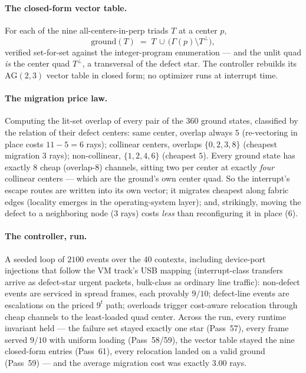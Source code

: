\documentclass[11pt]{article}
\begin{document}
\paragraph{The closed-form vector table.}  For each of the nine
all-centers-in-perp triads \(T\) at a center \(p\),
\[
  \mathrm{ground}(T) \;=\; T \,\cup\, \bigl(\Gamma(p)\setminus T^{\perp}\bigr),
\]
verified set-for-set against the integer-program enumeration --- and the unlit
quad \emph{is} the center quad \(T^\perp\), a transversal of the defect star.
The controller rebuilds its \(\mathrm{AG}(2,3)\) vector table in closed form;
no optimizer runs at interrupt time.

\paragraph{The migration price law.}  Computing the lit-set overlap of every
pair of the \(360\) ground states, classified by the relation of their defect
centers: same center, overlap always \(5\) (re-vectoring in place costs
\(11-5=6\) rays); collinear centers, overlaps \(\{0,2,3,8\}\) (cheapest
migration \(3\) rays); non-collinear, \(\{1,2,4,6\}\) (cheapest \(5\)).  Every
ground state has exactly \(8\) cheap (overlap-\(8\)) channels, sitting two per
center at exactly \emph{four} collinear centers --- which are the ground's own
center quad.  So the interrupt's escape routes are written into its own
vector; it migrates cheapest along fabric edges (locality emerges in the
operating-system layer); and, strikingly, moving the defect to a neighboring
node (\(3\) rays) costs \emph{less} than reconfiguring it in place (\(6\)).

\paragraph{The controller, run.}  A seeded loop of \(2100\) events over the
\(40\) contexts, including device-port injections that follow the VM track's
USB mapping (interrupt-class transfers arrive as defect-star urgent packets,
bulk-class as ordinary line traffic): non-defect events are serviced in spread
frames, each provably \(9/10\); defect-line events are escalations on the
priced \(9^t\) path; overloads trigger cost-aware relocation through cheap
channels to the least-loaded quad center.  Across the run, every runtime
invariant held --- the failure set stayed exactly one star (Pass~57), every
frame served \(9/10\) with uniform loading (Pass~58/59), the vector table
stayed the nine closed-form entries (Pass~61), every relocation landed on a
valid ground (Pass~59) --- and the average migration cost was exactly
\(3.00\) rays.
\end{document}
